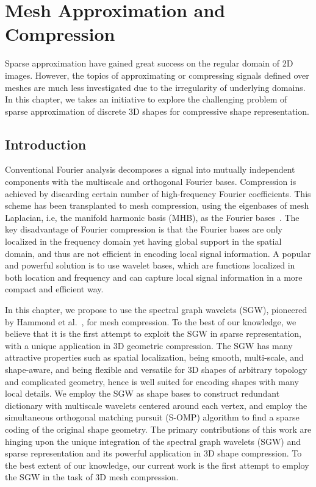 \chapter{Mesh Approximation and Compression}

Sparse approximation have gained great success on the regular domain
of 2D images. However, the topics of approximating or compressing signals defined
over meshes are much less investigated due to the irregularity of
underlying domains. In this chapter, we
takes an initiative to explore the challenging problem of sparse
approximation of discrete 3D shapes for compressive shape representation.

\section{Introduction}

Conventional Fourier analysis decomposes a signal into mutually
independent components with the multiscale and orthogonal Fourier
bases. Compression is achieved by discarding certain number of
high-frequency Fourier coefficients. This scheme has been transplanted
to mesh compression, using the eigenbases of mesh Laplacian, i.e, the
manifold harmonic basis (MHB), as the Fourier
bases~\cite{Karni2000}. The key disadvantage of Fourier
compression is that the Fourier bases are only localized in the
frequency domain yet having global support in the spatial domain, and
thus are not efficient in encoding local signal information. A popular
and powerful solution is to use wavelet bases, which are functions
localized in both location and frequency and can capture local signal
information in a more compact and efficient way.

In this chapter, we propose to use the spectral graph wavelets (SGW),
pioneered by Hammond et al.~\cite{Hammond2011}, for mesh
compression. To the best of our knowledge, we believe that it is the
first attempt to exploit the SGW in sparse representation, with a
unique application in 3D geometric compression. The SGW has many
attractive properties such as spatial localization, being smooth,
multi-scale, and shape-aware, and being flexible and versatile for 3D
shapes of arbitrary topology and complicated geometry, hence is well
suited for encoding shapes with many local details. We employ the SGW
as shape bases to construct redundant dictionary with multiscale
wavelets centered around each vertex, and employ the simultaneous
orthogonal matching pursuit (S-OMP) algorithm to find a sparse coding
of the original shape geometry. The primary contributions of this work
are hinging upon the unique integration of the spectral graph wavelets
(SGW) and sparse representation and its powerful application in 3D
shape compression. To the best extent of our knowledge, our current
work is the first attempt to employ the SGW in the task of 3D mesh compression.

